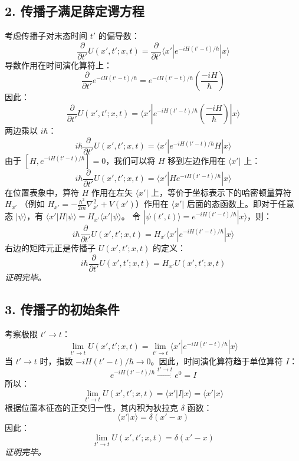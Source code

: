 \documentclass[12pt, a4paper]{article}
\begin{document}
\subsection*{2. 传播子满足薛定谔方程}
考虑传播子对末态时间 \(t'\) 的偏导数：
\[ \frac{\partial}{\partial t'} U(x', t'; x, t) = \frac{\partial}{\partial t'} \langle x' | e^{-iH(t'-t)/\hbar} | x \rangle \]
导数作用在时间演化算符上：
\[ \frac{\partial}{\partial t'} e^{-iH(t'-t)/\hbar} = e^{-iH(t'-t)/\hbar} \left( \frac{-iH}{\hbar} \right) \]
因此：
\[ \frac{\partial}{\partial t'} U(x', t'; x, t) = \langle x' | e^{-iH(t'-t)/\hbar} \left( \frac{-iH}{\hbar} \right) | x \rangle \]
两边乘以 \(i\hbar\)：
\[ i\hbar \frac{\partial}{\partial t'} U(x', t'; x, t) = \langle x' | e^{-iH(t'-t)/\hbar} H | x \rangle \]
由于 \([H, e^{-iH(t'-t)/\hbar}] = 0\)，我们可以将 \(H\) 移到左边作用在 \(\langle x'|\) 上：
\[ i\hbar \frac{\partial}{\partial t'} U(x', t'; x, t) = \langle x' | H e^{-iH(t'-t)/\hbar} | x \rangle \]
在位置表象中，算符 \(H\) 作用在左矢 \(\langle x'|\) 上，等价于坐标表示下的哈密顿量算符 \(H_{x'}\) （例如 \(H_{x'} = -\frac{\hbar^2}{2m}\nabla_{x'}^2 + V(x')\)）作用在 \(\langle x'|\) 后面的态函数上。即对于任意态 \(|\psi\rangle\)，有 \(\langle x'|H|\psi\rangle = H_{x'} \langle x'|\psi\rangle\)。
令 \(|\psi(t', t)\rangle = e^{-iH(t'-t)/\hbar} |x\rangle\)，则：
\[ i\hbar \frac{\partial}{\partial t'} U(x', t'; x, t) = H_{x'} \langle x' | e^{-iH(t'-t)/\hbar} | x \rangle \]
右边的矩阵元正是传播子 \(U(x', t'; x, t)\) 的定义：
\[ i\hbar \frac{\partial}{\partial t'} U(x', t'; x, t) = H_{x'} U(x', t'; x, t) \]
\textit{证明完毕。}
\subsection*{3. 传播子的初始条件}
考察极限 \(t' \to t\)：
\[ \lim_{t' \to t} U(x', t'; x, t) = \lim_{t' \to t} \langle x' | e^{-iH(t'-t)/\hbar} | x \rangle \]
当 \(t' \to t\) 时，指数 \( -iH(t'-t)/\hbar \to 0 \)。因此，时间演化算符趋于单位算符 \(I\)：
\[ e^{-iH(t'-t)/\hbar} \xrightarrow{t' \to t} e^0 = I \]
所以：
\[ \lim_{t' \to t} U(x', t'; x, t) = \langle x' | I | x \rangle = \langle x' | x \rangle \]
根据位置本征态的正交归一性，其内积为狄拉克 \(\delta\) 函数：
\[ \langle x' | x \rangle = \delta(x' - x) \]
因此：
\[ \lim_{t' \to t} U(x', t'; x, t) = \delta(x' - x) \]
\textit{证明完毕。}
\end{document}
